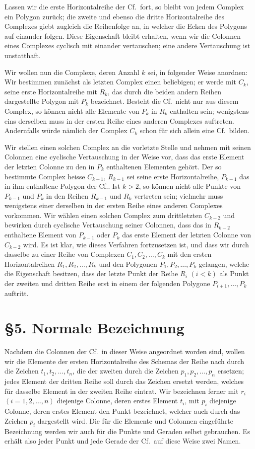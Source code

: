 \documentclass[11pt]{article}
\newcommand{\Cf}{\textup{Cf.}}
\begin{document}
Lassen wir die erste Horizontalreihe der \Cf\ fort, so bleibt von jedem Complex ein Polygon zurück; die zweite und ebenso die dritte Horizontalreihe des Complexes giebt zugleich die Reihenfolge an, in welcher die Ecken des Polygons auf einander folgen. Diese Eigenschaft bleibt erhalten, wenn wir die Colonnen eines Complexes cyclisch mit einander vertauschen; eine andere Vertauschung ist unstatthaft.

Wir wollen nun die Complexe, deren Anzahl $k$ sei, in folgender Weise anordnen: Wir bestimmen zunächst als letzten Complex einen beliebigen; er werde mit $C_k$, seine erste Horizontalreihe mit $R_k$, das durch die beiden andern Reihen dargestellte Polygon mit $P_k$ bezeichnet. Besteht die \Cf\ nicht nur aus diesem Complex, so können nicht alle Elemente von $P_k$ in $R_k$ enthalten sein; wenigstens eins derselben muss in der ersten Reihe eines anderen Complexes auftreten. Andernfalls würde nämlich der Complex $C_k$ schon für sich allein eine \Cf\ bilden.

Wir stellen einen solchen Complex an die vorletzte Stelle und nehmen mit seinen Colonnen eine cyclische Vertauschung in der Weise vor, dass das erste Element der letzten Colonne zu den in $P_k$ enthaltenen Elementen gehört. Der so bestimmte Complex heisse $C_{k-1}$, $R_{k-1}$ sei seine erste Horizontalreihe, $P_{k-1}$ das in ihm enthaltene Polygon der \Cf. Ist $k>2$, so können nicht alle Punkte von $P_{k-1}$ und $P_k$ in den Reihen $R_{k-1}$ und $R_k$ vertreten sein; vielmehr muss wenigstens einer derselben in der ersten Reihe eines anderen Complexes vorkommen. Wir wählen einen solchen Complex zum drittletzten $C_{k-2}$ und bewirken durch cyclische Vertauschung seiner Colonnen, dass das in $R_{k-2}$ enthaltene Element von $P_{k-1}$ oder $P_k$ das erste Element der letzten Colonne von $C_{k-2}$ wird. Es ist klar, wie dieses Verfahren fortzusetzen ist, und dass wir durch dasselbe zu einer Reihe von Complexen $C_1,C_2,\ldots,C_k$ mit den ersten Horizontalreihen $R_1,R_2,\ldots,R_k$ und den Polygonen $P_1,P_2,\ldots,P_k$ gelangen, welche die Eigenschaft besitzen, dass der letzte Punkt der Reihe $R_i$ $(i<k)$ als Punkt der zweiten und dritten Reihe erst in einem der folgenden Polygone $P_{i+1},\ldots,P_k$ auftritt.

\section*{\S 5. Normale Bezeichnung}
Nachdem die Colonnen der \Cf\ in dieser Weise angeordnet worden sind, wollen wir die Elemente der ersten Horizontalreihe des Schemas der Reihe nach durch die Zeichen $t_1,t_2,\ldots,t_n$, die der zweiten durch die Zeichen $p_1,p_2,\ldots,p_n$ ersetzen; jedes Element der dritten Reihe soll durch das Zeichen ersetzt werden, welches für dasselbe Element in der zweiten Reihe eintrat. Wir bezeichnen ferner mit $r_i$ $(i=1,2,\ldots,n)$ diejenige Colonne, deren erstes Element $t_i$, mit $p_i$ diejenige Colonne, deren erstes Element den Punkt bezeichnet, welcher auch durch das Zeichen $p_i$ dargestellt wird. Die für die Elemente und Colonnen eingeführte Bezeichnung werden wir auch für die Punkte und Geraden selbst gebrauchen. Es erhält also jeder Punkt und jede Gerade der \Cf\ auf diese Weise zwei Namen.
\end{document}
